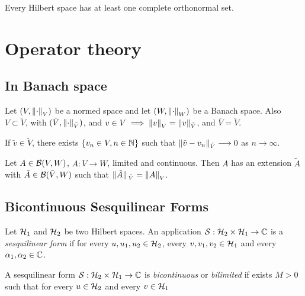 \documentclass[oneside, 10pt, notitlepage]{book}
\begin{document}
\begin{theorem}
	Every Hilbert space has at least one complete orthonormal set.
\end{theorem}



\chapter{Operator theory}

\section{In Banach space}

Let \((V,\norm{\cdot}_V)\) be a normed space and let \((W,\norm{\cdot}_{W})\) be a Banach space.
Also \(V\subset \tilde{V}\), with \((\tilde{V},\norm{\cdot}_{\tilde{V}})\),
and \(v\in V \implies \norm{v}_V = \norm{v}_{\tilde{V}}\),
and \(\overline{V}=\tilde{V}\).\par
If \(\tilde{v}\in \tilde{V}\), there exists \(\left\{v_n\in V, n\in\mathbb{N}\right\}\) such that \(\norm{\tilde{v}-v_n}_{\tilde{V}}\longrightarrow 0 \) as \(n\to \infty\).\par

\begin{theorem}
	Let \(A\in \mathcal{B}(V,W)\), \(A:V\to W\), limited and continuous. Then \(A\) has an extension \(\tilde{A}\) with \(\tilde{A}\in \mathcal{B}(\tilde{V},W)\) such that \(\norm*{\tilde{A}}_{\tilde{V}} = \norm{A}_V\).
\end{theorem}


\section{Bicontinuous Sesquilinear Forms}

\begin{definition}
	Let \(\mathcal{H}_1\) and \(\mathcal{H}_2\) be two Hilbert spaces. An application \(\mathcal{S}:\mathcal{H}_2\times \mathcal{H}_1\to \mathbb{C}\) is a \emph{sesquilinear form} if
	for every \(u,u_1,u_2\in \mathcal{H}_2\), every \(v,v_1,v_2\in \mathcal{H}_1\) and every \(\alpha_1,\alpha_2\in\mathbb{C}\).
\end{definition}

\begin{definition}
	A sesquilinear form \(\mathcal{S}:\mathcal{H}_2\times \mathcal{H}_1\to\mathbb{C}\) is \emph{bicontinuous} or \emph{bilimited} if exists \(M>0\) such that
	for every \(u\in {\mathcal{H}_2}\) and every \(v\in{\mathcal{H}_1}\)
\end{definition}
\end{document}
